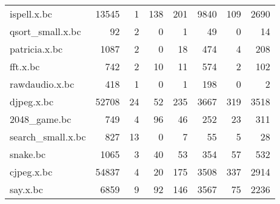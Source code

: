 \begin{tabular}{lrrrrrrr}
 ispell.x.bc          &               13545 &                    1 &                        138 &                  201 &                     9840 &                                109 &                          2690 \\
 qsort\_small.x.bc     &                  92 &                    2 &                          0 &                    1 &                       49 &                                  0 &                            14 \\
 patricia.x.bc        &                1087 &                    2 &                          0 &                   18 &                      474 &                                  4 &                           208 \\
 fft.x.bc             &                 742 &                    2 &                         10 &                   11 &                      574 &                                  2 &                           102 \\
 rawdaudio.x.bc       &                 418 &                    1 &                          0 &                    1 &                      198 &                                  0 &                             2 \\
 djpeg.x.bc           &               52708 &                   24 &                         52 &                  235 &                     3667 &                                319 &                          3518 \\
 2048\_game.bc         &                 749 &                    4 &                         96 &                   46 &                      252 &                                 23 &                           311 \\
 search\_small.x.bc    &                 827 &                   13 &                          0 &                    7 &                       55 &                                  5 &                            28 \\
 snake.bc             &                1065 &                    3 &                         40 &                   53 &                      354 &                                 57 &                           532 \\
 cjpeg.x.bc           &               54837 &                    4 &                         20 &                  175 &                     3508 &                                337 &                          2914 \\
 say.x.bc             &                6859 &                    9 &                         92 &                  146 &                     3567 &                                 75 &                          2236 \\
\hline
\end{tabular}